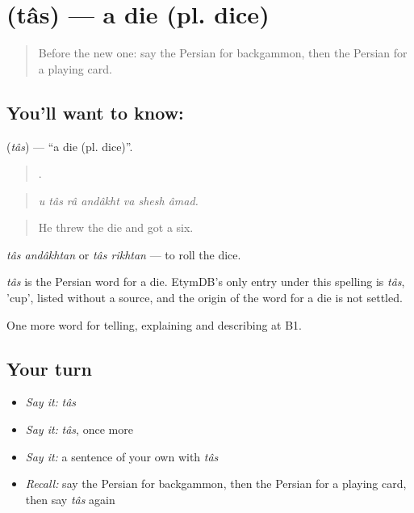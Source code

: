 \section[\texorpdfstring{\fa{تاس} (tâs)}{تاس (tâs)}]{ (tâs) — a die (pl. dice)}

\label{lesson:FA-C509-tas}



\begin{quote}
Before the new one: say the Persian for backgammon, then the Persian for a playing card.
\end{quote}

\subsection*{You'll want to know: }
\textbf{} (\emph{tâs}) — \textquotedblleft{}a die (pl. dice)\textquotedblright{}.

\begin{quote}
      .
\end{quote}

\begin{quote}
\emph{u tâs râ andâkht va shesh âmad.}
\end{quote}

\begin{quote}
He threw the die and got a six.
\end{quote}

\emph{tâs andâkhtan} or \emph{tâs rikhtan} — to roll the dice.

\begin{cousinweb}
\emph{tâs} is the Persian word for a die. EtymDB's only entry under this spelling is \emph{tâs}, 'cup', listed without a source, and the origin of the word for a die is not settled.
\end{cousinweb}

\begin{grammarlens}[title={What you've built}]
One more word for telling, explaining and describing at B1.
\end{grammarlens}

\subsection*{Your turn}
\begin{itemize}
\raggedright
  \item \emph{Say it:} \emph{tâs}
  \item \emph{Say it:} \emph{tâs}, once more
  \item \emph{Say it:} a sentence of your own with \emph{tâs}
  \item \emph{Recall:} say the Persian for backgammon, then the Persian for a playing card, then say \emph{tâs} again
\end{itemize}

